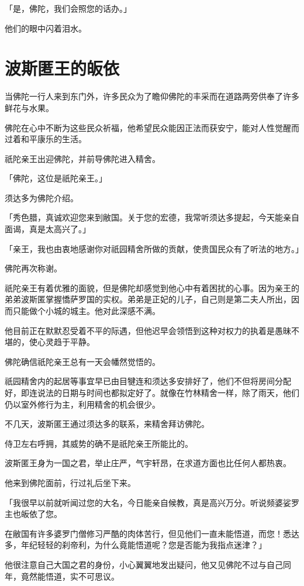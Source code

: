 \documentclass[twoside,openany]{book}
\begin{document}
「是，佛陀，我们会照您的话办。」

他们的眼中闪着泪水。

\section{波斯匿王的皈依}\label{sec6.6}

当佛陀一行人来到东门外，许多民众为了瞻仰佛陀的丰采而在道路两旁供奉了许多鲜花与水果。

佛陀在心中不断为这些民众祈福，他希望民众能因正法而获安宁，能对人性觉醒而过着和平康乐的生活。

祇陀亲王出迎佛陀，并前导佛陀进入精舍。

「佛陀，这位是祇陀亲王。」

须达多为佛陀介绍。

「秀色腊，真诚欢迎您来到敝国。关于您的宏德，我常听须达多提起，今天能亲自面谒，真是太高兴了。」

「亲王，我也由衷地感谢你对祇园精舍所做的贡献，使贵国民众有了听法的地方。」

佛陀再次称谢。

祇陀亲王有着优雅的面貌，但是佛陀却感觉到他心中有着困扰的心事。因为亲王的弟弟波斯匿掌握憍萨罗国的实权。弟弟是正妃的儿子，自己则是第二夫人所出，因而只能做个小城的城主。他对此深感不满。

他目前正在默默忍受着不平的际遇，但他迟早会领悟到这种对权力的执着是愚昧不堪的，使心灵趋于平静。

佛陀确信祇陀亲王总有一天会幡然觉悟的。

祇园精舍内的起居等事宜早已由目犍连和须达多安排好了，他们不但将房间分配好，即连说法的日期与时间也都拟定好了。就像在竹林精舍一样，除了雨天，他们仍以室外修行为主，利用精舍的机会很少。

不几天，波斯匿王通过须达多的联系，来精舍拜访佛陀。

侍卫左右呼拥，其威势的确不是祇陀亲王所能比的。

波斯匿王身为一国之君，举止庄严，气宇轩昂，在求道方面也比任何人都热衷。

他来到佛陀面前，行过礼后坐下来。

「我很早以前就听闻过您的大名，今日能亲自候教，真是高兴万分。听说频婆娑罗主也皈依了您。

在敝国有许多婆罗门僧修习严酷的肉体苦行，但见他们一直未能悟道，而您！悉达多，年纪轻轻的刹帝利，为什么竟能悟道呢？您是否能为我指点迷津？」

他很注意自己大国之君的身份，小心翼翼地发出疑问，他又见佛陀不过与自己同年，竟然能悟道，实不可思议。
\end{document}
